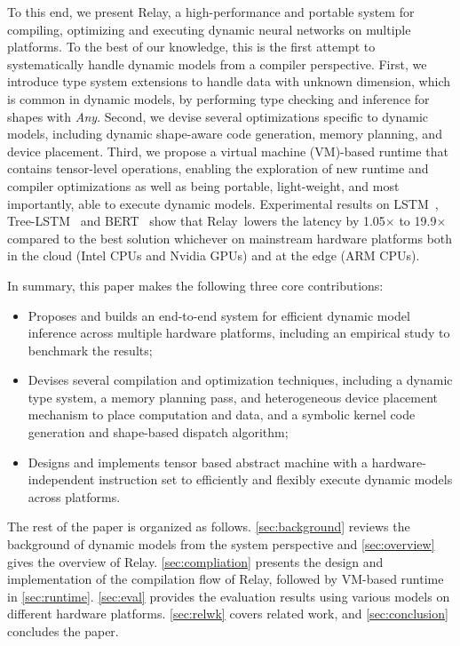To this end, we present Relay, a high-performance and portable system for compiling, optimizing and executing dynamic neural networks on multiple platforms.
To the best of our knowledge, this is the first attempt to systematically handle dynamic models from a compiler perspective.
First, we introduce type system extensions to handle data with unknown dimension, which is common in dynamic models, by performing type checking and inference for shapes with {\em Any}.
Second, we devise several optimizations specific to dynamic models, including dynamic shape-aware code generation, memory planning, and device placement.
Third, we propose a virtual machine (VM)-based runtime that contains tensor-level operations, enabling the exploration of new runtime and compiler optimizations as well as
being portable, light-weight, and most importantly, able to execute dynamic models.
Experimental results on LSTM~\citep{lstm}, Tree-LSTM~\citep{tree_lstm} and BERT~\citep{devlin2018bert} show that Relay~lowers the latency by 1.05$\times$ to 19.9$\times$ compared to the best solution whichever on mainstream hardware platforms both in the cloud (Intel CPUs and Nvidia GPUs) and at the edge (ARM CPUs).

In summary, this paper makes the following three core contributions:
\begin{itemize}
    \item Proposes and builds an end-to-end system for efficient dynamic model inference across multiple hardware platforms, including an empirical study to benchmark the results;
    \item Devises several compilation and optimization techniques,
    including a dynamic type system, a memory planning pass, and heterogeneous device placement mechanism to place computation and data, and a symbolic kernel code generation and shape-based dispatch algorithm;
    \item Designs and implements tensor based abstract machine with a hardware-independent instruction set to efficiently and flexibly execute dynamic models across platforms.
\end{itemize}

The rest of the paper is organized as follows. \autoref{sec:background} reviews the background of dynamic models from the system perspective and \autoref{sec:overview} gives the overview of Relay.
\autoref{sec:compliation} presents the design and implementation of the compilation flow of Relay, followed by VM-based runtime in \autoref{sec:runtime}. \autoref{sec:eval} provides the evaluation results using various models on different hardware platforms.
\autoref{sec:relwk} covers related work, and \autoref{sec:conclusion} concludes the paper.

